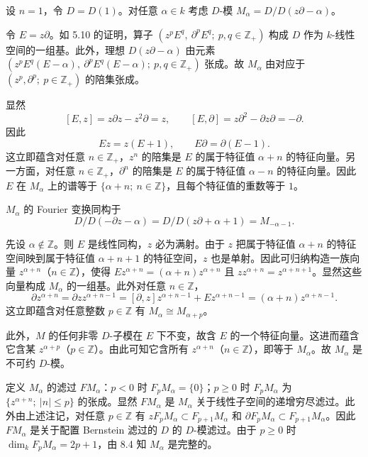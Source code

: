 \begin{example}
设 $n=1$，令 $D=D(1)$。对任意 $\alpha\in k$ 考虑 $D$-模 $M_\alpha=D/D(z\partial-\alpha)$。

令 $E=z\partial$。如 5.10 的证明，算子 $(z^pE^q,\ \partial^pE^q;\ p,q\in\mathbb{Z}_+)$ 构成 $D$ 作为 $k$-线性空间的一组基。此外，理想 $D(z\partial-\alpha)$ 由元素 $(z^pE^q(E-\alpha),\ \partial^pE^q(E-\alpha);\ p,q\in\mathbb{Z}_+)$ 张成。故 $M_\alpha$ 由对应于 $(z^p,\partial^p;\ p\in\mathbb{Z}_+)$ 的陪集张成。

显然
$$[E,z]=z\partial z-z^2\partial=z,\qquad [E,\partial]=z\partial^2-\partial z\partial=-\partial.$$
因此
$$Ez=z(E+1),\qquad E\partial=\partial(E-1).$$
这立即蕴含对任意 $n\in\mathbb{Z}_+$，$z^n$ 的陪集是 $E$ 的属于特征值 $\alpha+n$ 的特征向量。另一方面，对任意 $n\in\mathbb{Z}_+$，$\partial^n$ 的陪集是 $E$ 的属于特征值 $\alpha-n$ 的特征向量。因此 $E$ 在 $M_\alpha$ 上的谱等于 $\{\alpha+n;\ n\in\mathbb{Z}\}$，且每个特征值的重数等于 $1$。

$M_\alpha$ 的 Fourier 变换同构于
$$D/D(-\partial z-\alpha)=D/D(z\partial+\alpha+1)=M_{-\alpha-1}.$$

先设 $\alpha\notin\mathbb{Z}$。则 $E$ 是线性同构，$z$ 必为满射。由于 $z$ 把属于特征值 $\alpha+n$ 的特征空间映到属于特征值 $\alpha+n+1$ 的特征空间，$z$ 也是单射。因此可归纳构造一族向量 $z^{\alpha+n}$（$n\in\mathbb{Z}$），使得 $Ez^{\alpha+n}=(\alpha+n)z^{\alpha+n}$ 且 $zz^{\alpha+n}=z^{\alpha+n+1}$。显然这些向量构成 $M_\alpha$ 的一组基。此外对任意 $n\in\mathbb{Z}$，
$$\partial z^{\alpha+n}=\partial zz^{\alpha+n-1}=[\partial,z]z^{\alpha+n-1}+Ez^{\alpha+n-1}=(\alpha+n)z^{\alpha+n-1}.$$
这立即蕴含对任意整数 $p\in\mathbb{Z}$ 有 $M_\alpha\cong M_{\alpha+p}$。

此外，$M$ 的任何非零 $D$-子模在 $E$ 下不变，故含 $E$ 的一个特征向量。这进而蕴含它含某 $z^{\alpha+p}$（$p\in\mathbb{Z}$）。由此可知它含所有 $z^{\alpha+n}$（$n\in\mathbb{Z}$），即等于 $M_\alpha$。故 $M_\alpha$ 是不可约 $D$-模。

定义 $M_\alpha$ 的滤过 $F M_\alpha$：$p<0$ 时 $F_pM_\alpha=\{0\}$；$p\ge 0$ 时 $F_pM_\alpha$ 为 $\{z^{\alpha+n};\ |n|\le p\}$ 的张成。显然 $F M_\alpha$ 是 $M_\alpha$ 关于线性子空间的递增穷尽滤过。此外由上述注记，对任意 $p\in\mathbb{Z}$ 有 $zF_pM_\alpha\subset F_{p+1}M_\alpha$ 和 $\partial F_pM_\alpha\subset F_{p+1}M_\alpha$。因此 $F M_\alpha$ 是关于配置 Bernstein 滤过的 $D$ 的 $D$-模滤过。由于 $p\ge 0$ 时 $\dim_k F_pM_\alpha=2p+1$，由 8.4 知 $M_\alpha$ 是完整的。


\end{example}

